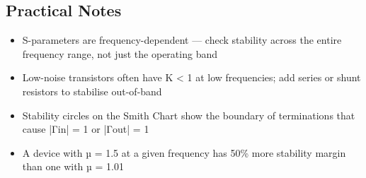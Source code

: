 				

\subsection{Practical Notes}

				
\begin{itemize}

					\item S-parameters are frequency-dependent — check stability across the entire frequency range, not just the operating band

					\item Low-noise transistors often have K \textless{} 1 at low frequencies; add series or shunt resistors to stabilise out-of-band

					\item Stability circles on the Smith Chart show the boundary of terminations that cause |Γin| = 1 or |Γout| = 1

					\item A device with µ = 1.5 at a given frequency has 50\% more stability margin than one with µ = 1.01

				
\end{itemize}



